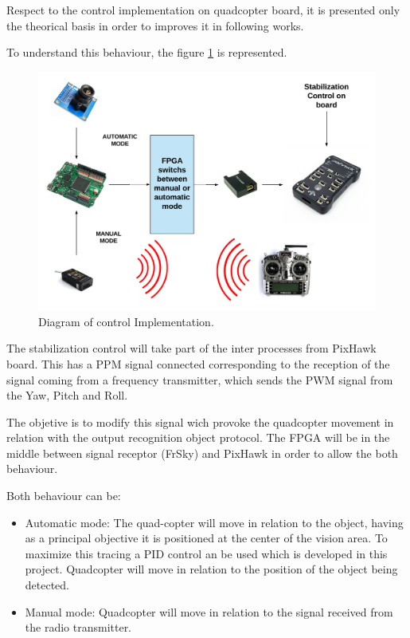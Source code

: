 Respect to the control implementation on quadcopter board, it is presented only the theorical basis in order to improves it in following works. 

To understand this behaviour, the figure  \ref{fig:control_implemtation} is represented.

\begin{figure}[H]
	\center
	\includegraphics[trim = 0mm 0cm 0mm 0cm, clip,scale=0.4]{imagenes/Cuadricoptero_vision/control_implementation.pdf}
	\caption{Diagram of control Implementation.}
	\label{fig:control_implemtation}
\end{figure}


The stabilization control will take part of the inter processes from PixHawk board. This has a PPM signal connected corresponding to the reception of the signal coming from a frequency transmitter, which sends the PWM signal from the Yaw, Pitch and Roll. \newline

The objetive is to modify this signal wich provoke the quadcopter movement in relation with the output recognition object protocol. The FPGA will be in the middle between signal receptor (FrSky) and PixHawk in order to allow the both behaviour. 

Both behaviour can be:

\begin{itemize}
	\item Automatic mode: The quad-copter will move in relation to the object, having as a principal objective it is positioned at the center of the vision area. To maximize this tracing a PID control an be used which is developed in this project. Quadcopter will move in relation to the position of the object being detected.
	\item Manual mode: Quadcopter will move in relation to the signal received from the radio transmitter.
\end{itemize}
